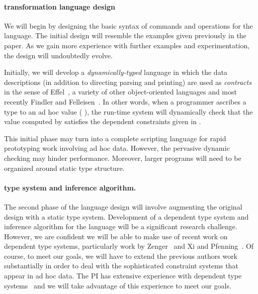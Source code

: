\documentclass[11pt]{article}
\begin{document}



\paragraph*{\datatype{} transformation language design}
We will begin by designing the basic syntax of commands and operations
for the language.  The initial design will resemble the examples
given previously in the paper.  As we gain more experience with further
examples and experimentation, the design will undoubtedly evolve.

Initially, we will develop a {\em dynamically-typed} language in which
the data descriptions (in addition to directing parsing and printing)
are used as {\em contracts} in the sense of 
Effel~\cite{},
a variety of other object-oriented languages and most recently Findler and 
Felleisen~\cite{findler+:contracts}.  In other words, when 
a programmer ascribes a type to an ad hoc
value (\eg{} ), the run-time system will dynamically 
check that the value computed by  satisfies
the dependent constraints given in .  

This initial phase may turn into a complete scripting language
for rapid prototyping work involving ad hoc data.  However, the
pervasive dynamic checking may hinder performance.  Moreover,
larger programs will need to be organized around static type 
structure.

\paragraph*{\datatype{} type system and inference algorithm.}
The second phase of the language design will involve augmenting the
original design with a static type system.  Development of a dependent
type system and inference algorithm for the language will be a
significant research challenge.  However, we are confident we will be
able to make use of recent work on dependent type systems,
particularly work by Zenger~\cite{zenger:indexed-types} and Xi and
Pfenning~\cite{xi+:dml}.  Of course, to meet our goals, we will have
to extend the previous authors work substantially in order to deal
with the sophisticated constraint systems that appear in ad hoc data.
The PI has extensive experience with dependent type
systems~\cite{walker:popl00,smith+:alias,walker+:capabilities,mandelbaum+:effective-refinements,ahmed+:hierarchical,tan+:tcs04}
and we will take advantage of this experience to meet our goals.
\end{document}
